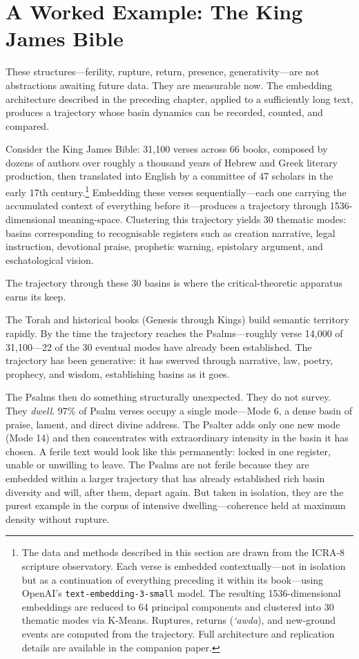 \section{A Worked Example: The King James Bible}

These structures---ferility, rupture, return, presence, generativity---are not abstractions awaiting future data. They are measurable now. The embedding architecture described in the preceding chapter, applied to a sufficiently long text, produces a trajectory whose basin dynamics can be recorded, counted, and compared.

Consider the King James Bible: 31,100 verses across 66 books, composed by dozens of authors over roughly a thousand years of Hebrew and Greek literary production, then translated into English by a committee of 47 scholars in the early 17th century.\footnote{The data and methods described in this section are drawn from the ICRA-8 scripture observatory. Each verse is embedded contextually---not in isolation but as a continuation of everything preceding it within its book---using OpenAI's \texttt{text-embedding-3-small} model. The resulting 1536-dimensional embeddings are reduced to 64 principal components and clustered into 30 thematic modes via K-Means. Ruptures, returns (\emph{`awda}), and new-ground events are computed from the trajectory. Full architecture and replication details are available in the companion paper.} Embedding these verses sequentially---each one carrying the accumulated context of everything before it---produces a trajectory through 1536-dimensional meaning-space. Clustering this trajectory yields 30 thematic modes: basins corresponding to recognisable registers such as creation narrative, legal instruction, devotional praise, prophetic warning, epistolary argument, and eschatological vision.

The trajectory through these 30 basins is where the critical-theoretic apparatus earns its keep.

The Torah and historical books (Genesis through Kings) build semantic territory rapidly. By the time the trajectory reaches the Psalms---roughly verse 14,000 of 31,100---22 of the 30 eventual modes have already been established. The trajectory has been generative: it has swerved through narrative, law, poetry, prophecy, and wisdom, establishing basins as it goes.

The Psalms then do something structurally unexpected. They do not survey. They \emph{dwell}. 97\% of Psalm verses occupy a single mode---Mode 6, a dense basin of praise, lament, and direct divine address. The Psalter adds only one new mode (Mode 14) and then concentrates with extraordinary intensity in the basin it has chosen. A ferile text would look like this permanently: locked in one register, unable or unwilling to leave. The Psalms are not ferile because they are embedded within a larger trajectory that has already established rich basin diversity and will, after them, depart again. But taken in isolation, they are the purest example in the corpus of intensive dwelling---coherence held at maximum density without rupture.


